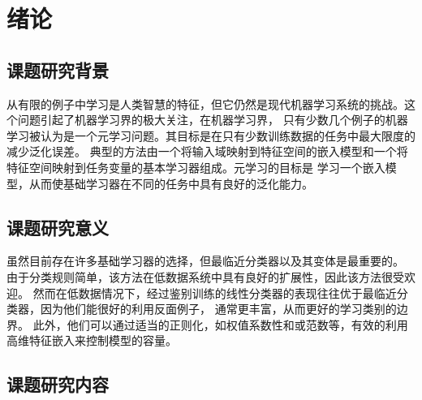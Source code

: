 

\chapter{绪论}

\section{课题研究背景}

从有限的例子中学习是人类智慧的特征，但它仍然是现代机器学习系统的挑战。这个问题引起了机器学习界的极大关注，在机器学习界，
只有少数几个例子的机器学习被认为是一个元学习问题。其目标是在只有少数训练数据的任务中最大限度的减少泛化误差。
典型的方法由一个将输入域映射到特征空间的嵌入模型和一个将特征空间映射到任务变量的基本学习器组成。元学习的目标是
学习一个嵌入模型，从而使基础学习器在不同的任务中具有良好的泛化能力。

\section{课题研究意义}

虽然目前存在许多基础学习器的选择，但最临近分类器以及其变体是最重要的。
由于分类规则简单，该方法在低数据系统中具有良好的扩展性，因此该方法很受欢迎。
然而在低数据情况下，经过鉴别训练的线性分类器的表现往往优于最临近分类器，因为他们能很好的利用反面例子，
通常更丰富，从而更好的学习类别的边界。
此外，他们可以通过适当的正则化，如权值系数性和或范数等，有效的利用高维特征嵌入来控制模型的容量。


\section{课题研究内容}



